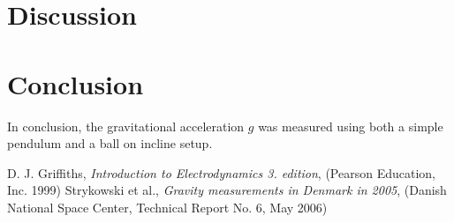 \documentclass[a4paper,%
                aps,%
                prl,%
                amsfonts,%
                amssymb,%
                amsmath,%
                nobibnotes,%
                twocolumn, %
                twoside,%
                balancelastpage,%
                eqsecnum] %
                {revtex4-1}
\begin{document}
\section{Discussion}

\section{Conclusion}

In conclusion, the gravitational acceleration $g$ was measured using both a
simple pendulum and a ball on incline setup.

\begin{thebibliography}{99}
 D. J. Griffiths, \emph{Introduction to Electrodynamics 3.
    edition}, (Pearson Education, Inc. 1999)
 Strykowski et al., \emph{Gravity measurements in Denmark
    in 2005}, (Danish National Space Center, Technical Report No. 6, May 2006)
\end{thebibliography}
\end{document}
